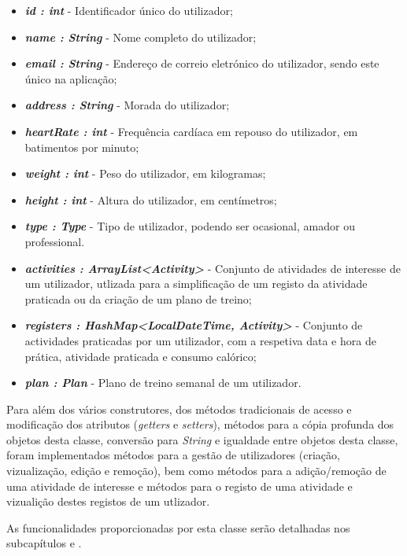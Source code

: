 \documentclass[a4paper,12pt]{scrreprt}
\begin{document}
    \begin{itemize}
        \item \textit{\textbf{id : int}} - Identificador único do utilizador;
        \item \textit{\textbf{name : String}} - Nome completo do utilizador;
        \item \textit{\textbf{email : String}} - Endereço de correio eletrónico do utilizador, sendo este único na aplicação;
        \item \textit{\textbf{address : String}} - Morada do utilizador;
        \item \textit{\textbf{heartRate : int}} - Frequência cardíaca em repouso do utilizador, em batimentos por minuto;
        \item \textit{\textbf{weight : int}} - Peso do utilizador, em kilogramas;
        \item \textit{\textbf{height : int}} - Altura do utilizador, em centímetros;
        \item \textit{\textbf{type : Type}} - Tipo de utilizador, podendo ser ocasional, amador ou professional.
        \item \textit{\textbf{activities : ArrayList<Activity>}} - Conjunto de atividades de interesse de um utilizador, utlizada para a simplificação de um registo da atividade praticada ou da criação de um plano de treino;
        \item \textit{\textbf{registers : HashMap<LocalDateTime, Activity>}} - Conjunto de actividades praticadas por um utilizador, com a respetiva data e hora de prática, atividade praticada e consumo calórico;
        \item \textit{\textbf{plan : Plan}} - Plano de treino semanal de um utilizador.
    \end{itemize}

    Para além dos vários construtores, dos métodos tradicionais de acesso e modificação dos atributos (\textit{getters} e \textit{setters}), métodos para a cópia profunda dos objetos desta classe, conversão para \textit{String} e igualdade entre objetos desta classe, foram implementados métodos para a gestão de utilizadores (criação, vizualização, edição e remoção), bem como métodos para a adição/remoção de uma atividade de interesse e métodos para o registo de uma atividade e vizualição destes registos de um utlizador.

    As funcionalidades proporcionadas por esta classe serão detalhadas nos subcapítulos \textit{} e \textit{}.
\end{document}
